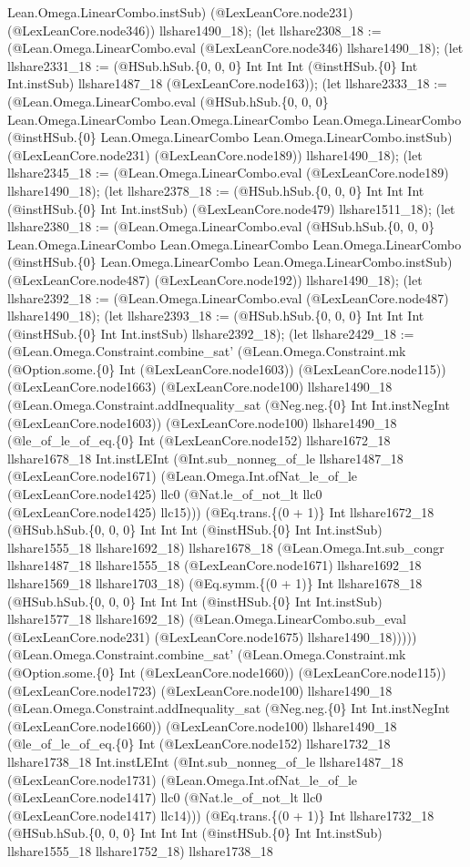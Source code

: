 \documentclass[11pt]{article}
\begin{document}
Lean.Omega.LinearCombo.instSub) (@LexLeanCore.node231) (@LexLeanCore.node346)) llshare1490\_18); (let llshare2308\_18 := (@Lean.Omega.LinearCombo.eval (@LexLeanCore.node346) llshare1490\_18); (let llshare2331\_18 := (@HSub.hSub.\{0, 0, 0\} Int Int Int (@instHSub.\{0\} Int Int.instSub) llshare1487\_18 (@LexLeanCore.node163)); (let llshare2333\_18 := (@Lean.Omega.LinearCombo.eval (@HSub.hSub.\{0, 0, 0\} Lean.Omega.LinearCombo Lean.Omega.LinearCombo Lean.Omega.LinearCombo (@instHSub.\{0\} Lean.Omega.LinearCombo Lean.Omega.LinearCombo.instSub) (@LexLeanCore.node231) (@LexLeanCore.node189)) llshare1490\_18); (let llshare2345\_18 := (@Lean.Omega.LinearCombo.eval (@LexLeanCore.node189) llshare1490\_18); (let llshare2378\_18 := (@HSub.hSub.\{0, 0, 0\} Int Int Int (@instHSub.\{0\} Int Int.instSub) (@LexLeanCore.node479) llshare1511\_18); (let llshare2380\_18 := (@Lean.Omega.LinearCombo.eval (@HSub.hSub.\{0, 0, 0\} Lean.Omega.LinearCombo Lean.Omega.LinearCombo Lean.Omega.LinearCombo (@instHSub.\{0\} Lean.Omega.LinearCombo Lean.Omega.LinearCombo.instSub) (@LexLeanCore.node487) (@LexLeanCore.node192)) llshare1490\_18); (let llshare2392\_18 := (@Lean.Omega.LinearCombo.eval (@LexLeanCore.node487) llshare1490\_18); (let llshare2393\_18 := (@HSub.hSub.\{0, 0, 0\} Int Int Int (@instHSub.\{0\} Int Int.instSub) llshare2392\_18); (let llshare2429\_18 := (@Lean.Omega.Constraint.combine\_sat' (@Lean.Omega.Constraint.mk (@Option.some.\{0\} Int (@LexLeanCore.node1603)) (@LexLeanCore.node115)) (@LexLeanCore.node1663) (@LexLeanCore.node100) llshare1490\_18 (@Lean.Omega.Constraint.addInequality\_sat (@Neg.neg.\{0\} Int Int.instNegInt (@LexLeanCore.node1603)) (@LexLeanCore.node100) llshare1490\_18 (@le\_of\_le\_of\_eq.\{0\} Int (@LexLeanCore.node152) llshare1672\_18 llshare1678\_18 Int.instLEInt (@Int.sub\_nonneg\_of\_le llshare1487\_18 (@LexLeanCore.node1671) (@Lean.Omega.Int.ofNat\_le\_of\_le (@LexLeanCore.node1425) llc0 (@Nat.le\_of\_not\_lt llc0 (@LexLeanCore.node1425) llc15))) (@Eq.trans.\{(0 + 1)\} Int llshare1672\_18 (@HSub.hSub.\{0, 0, 0\} Int Int Int (@instHSub.\{0\} Int Int.instSub) llshare1555\_18 llshare1692\_18) llshare1678\_18 (@Lean.Omega.Int.sub\_congr llshare1487\_18 llshare1555\_18 (@LexLeanCore.node1671) llshare1692\_18 llshare1569\_18 llshare1703\_18) (@Eq.symm.\{(0 + 1)\} Int llshare1678\_18 (@HSub.hSub.\{0, 0, 0\} Int Int Int (@instHSub.\{0\} Int Int.instSub) llshare1577\_18 llshare1692\_18) (@Lean.Omega.LinearCombo.sub\_eval (@LexLeanCore.node231) (@LexLeanCore.node1675) llshare1490\_18))))) (@Lean.Omega.Constraint.combine\_sat' (@Lean.Omega.Constraint.mk (@Option.some.\{0\} Int (@LexLeanCore.node1660)) (@LexLeanCore.node115)) (@LexLeanCore.node1723) (@LexLeanCore.node100) llshare1490\_18 (@Lean.Omega.Constraint.addInequality\_sat (@Neg.neg.\{0\} Int Int.instNegInt (@LexLeanCore.node1660)) (@LexLeanCore.node100) llshare1490\_18 (@le\_of\_le\_of\_eq.\{0\} Int (@LexLeanCore.node152) llshare1732\_18 llshare1738\_18 Int.instLEInt (@Int.sub\_nonneg\_of\_le llshare1487\_18 (@LexLeanCore.node1731) (@Lean.Omega.Int.ofNat\_le\_of\_le (@LexLeanCore.node1417) llc0 (@Nat.le\_of\_not\_lt llc0 (@LexLeanCore.node1417) llc14))) (@Eq.trans.\{(0 + 1)\} Int llshare1732\_18 (@HSub.hSub.\{0, 0, 0\} Int Int Int (@instHSub.\{0\} Int Int.instSub) llshare1555\_18 llshare1752\_18) llshare1738\_18 
\end{document}
